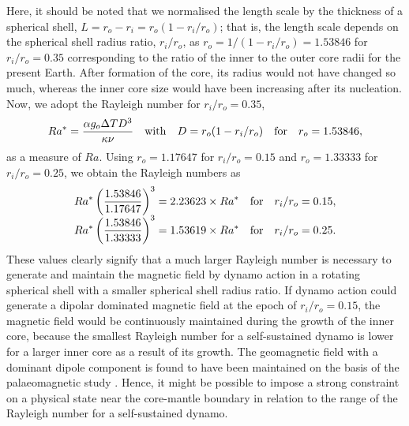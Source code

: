 Here, it should be noted that we normalised the length scale by the thickness of a spherical shell, $L = r_o - r_i = r_o (1 - r_i / r_o)$; that is, the length scale depends on the spherical shell radius ratio, $r_i / r_o$, as $r_o = 1 / (1 - r_i / r_o) = 1.53846$ for $r_i / r_o = 0.35$ corresponding to the ratio of the inner to the outer core radii for the present Earth.
After formation of the core, its radius would not have changed so much, whereas the inner core size would have been increasing after its nucleation.
Now, we adopt the Rayleigh number for $r_i / r_o = 0.35$,
%
\begin{equation}
    Ra^* = \frac{\alpha g_o \Delta T D^3}{\kappa\nu}
    ~~~{\rm with}~~~D = r_o (1 - r_i / r_o)
    ~~~{\rm for}~~~r_o = 1.53846,
\label{eq:Ra_0.35}
\end{equation}
%
as a measure of $Ra$.
Using $r_o = 1.17647$ for $r_i / r_o = 0.15$ and $r_o = 1.33333$ for $r_i / r_o = 0.25$, we obtain the Rayleigh numbers as
%
\begin{equation}
\begin{array}{l}
    \displaystyle
    Ra^* \left( \frac{1.53846}{1.17647} \right)^3
    = 2.23623 \times Ra^* 
    ~~~{\rm for} ~~~ r_i / r_o = 0.15,\\
    \displaystyle
    Ra^* \left( \frac{1.53846}{1.33333} \right)^3
    = 1.53619 \times Ra^* 
    ~~~{\rm for} ~~~ r_i / r_o = 0.25.
\end{array}
\end{equation}
%
These values clearly signify that a much larger Rayleigh number is necessary to generate and maintain the magnetic field by dynamo action in a rotating spherical shell with a smaller spherical shell radius ratio.
If dynamo action could generate a dipolar dominated magnetic field at the epoch of $r_i / r_o = 0.15$, the magnetic field would be continuously maintained during the growth of the inner core, because the smallest Rayleigh number for a self-sustained dynamo is lower for a larger inner core as a result of its growth.
The geomagnetic field with a dominant dipole component is found to have been maintained on the basis of the palaeomagnetic study \cite{Merrill:1996}.
Hence, it might be possible to impose a strong constraint on a physical state near the core-mantle boundary in relation to the range of the Rayleigh number for a self-sustained dynamo.

